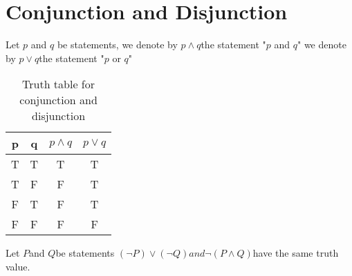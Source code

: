 \documentclass{book}
\numberwithin{equation}{section}
\begin{document}
\section{Conjunction and Disjunction}
\begin{definitionenv}
    Let $p$ and $q$ be statements,
    \newline
    we denote by $p\wedge q $the statement "$p$ and $q$"
    \newline
    we denote by $p\vee q $the statement "$p$ or $q$"
    
\end{definitionenv}

\begin{table}
    \begin{center}
\begin{tabular}{c|c|c|c}
    p & q & $p\wedge q$ & $p\vee q$ \\
    \hline
    T & T & T & T \\
    T & F & F & T \\
    F & T & F & T \\
    F & F & F & F \\    

\end{tabular}
\caption{Truth table for conjunction and disjunction} 
\end{center}
\end{table}

\begin{propositionenv}
    Let $P$and $Q$be statements $(\neg P)\vee (\neg Q)and \neg(P\wedge Q)$have the same truth value.
\end{propositionenv}
\end{document}
